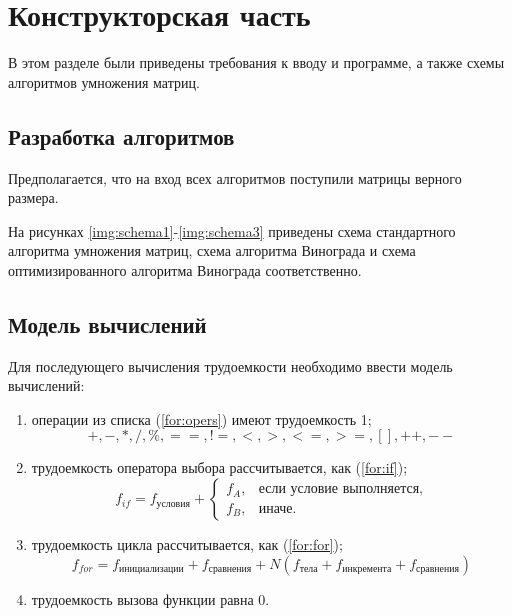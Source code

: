 \chapter{Конструкторская часть}
В этом разделе были приведены требования к вводу и программе, а также схемы алгоритмов умножения матриц.

\section{Разработка алгоритмов}

Предполагается, что на вход всех алгоритмов поступили матрицы верного размера.

На рисунках \ref{img:schema1}-\ref{img:schema3} приведены схема стандартного алгоритма умножения матриц, схема алгоритма Винограда и схема оптимизированного алгоритма Винограда соответственно.

\clearpage

\clearpage

\clearpage

\clearpage


\section{Модель вычислений}

Для последующего вычисления трудоемкости необходимо ввести модель вычислений:
\begin{enumerate}
	\item операции из списка (\ref{for:opers}) имеют трудоемкость 1;
	\begin{equation}
		\label{for:opers}
		+, -, *, /, \%, ==, !=, <, >, <=, >=, [], ++, {-}-
	\end{equation}
	\item трудоемкость оператора выбора  рассчитывается, как (\ref{for:if});
	\begin{equation}
		\label{for:if}
		f_{if} = f_{\text{условия}} +
		\begin{cases}
			f_A, & \text{если условие выполняется,}\\
			f_B, & \text{иначе.}
		\end{cases}
	\end{equation}
	\item трудоемкость цикла рассчитывается, как (\ref{for:for});
	\begin{equation}
		\label{for:for}
		f_{for} = f_{\text{инициализации}} + f_{\text{сравнения}} + N(f_{\text{тела}} + f_{\text{инкремента}} + f_{\text{сравнения}})
	\end{equation}
	\item трудоемкость вызова функции равна 0.
\end{enumerate}


